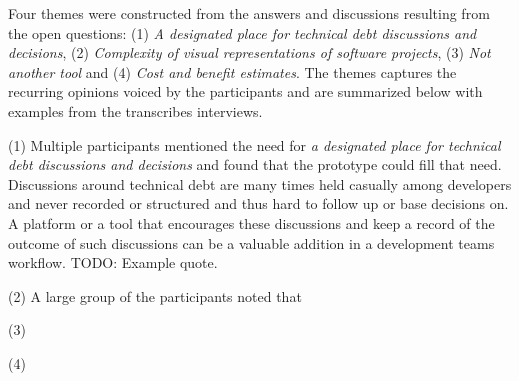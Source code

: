 Four themes were constructed from the answers and discussions resulting from the open questions: (1) \textit{A designated place for technical debt discussions and decisions}, (2) \textit{Complexity of visual representations of software projects}, (3) \textit{Not another tool} and (4) \textit{Cost and benefit estimates}.
The themes captures the recurring opinions voiced by the participants and are summarized below with examples from the transcribes interviews.

(1) Multiple participants mentioned the need for \textit{a designated place for technical debt discussions and decisions} and found that the prototype could fill that need.
Discussions around technical debt are many times held casually among developers and never recorded or structured and thus hard to follow up or base decisions on.
A platform or a tool that encourages these discussions and keep a record of the outcome of such discussions can be a valuable addition in a development teams workflow. 
TODO: Example quote.

(2) A large group of the participants noted that 

(3) 

(4) 
